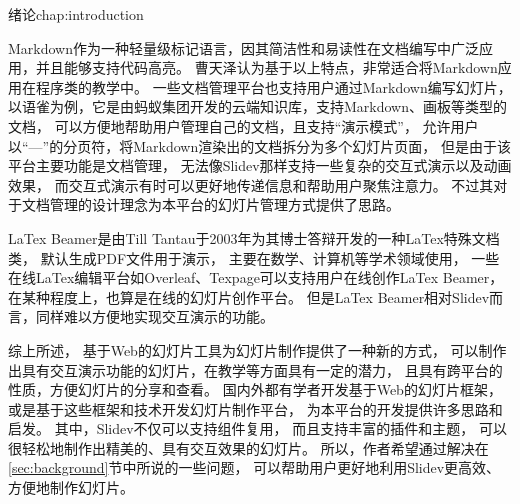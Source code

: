 \begin{cuzchapter}{绪论}{chap:introduction}
	

	
	Markdown作为一种轻量级标记语言，因其简洁性和易读性在文档编写中广泛应用，并且能够支持代码高亮。
	曹天泽认为基于以上特点，非常适合将Markdown应用在程序类的教学中\cite{HLKX202002056}。
	一些文档管理平台也支持用户通过Markdown编写幻灯片，
	以语雀为例，它是由蚂蚁集团开发的云端知识库，支持Markdown、画板等类型的文档，
	可以方便地帮助用户管理自己的文档，且支持“演示模式”，
	允许用户以“---”的分页符，将Markdown渲染出的文档拆分为多个幻灯片页面，
	但是由于该平台主要功能是文档管理，
	无法像Slidev那样支持一些复杂的交互式演示以及动画效果，
	而交互式演示有时可以更好地传递信息和帮助用户聚焦注意力。
	不过其对于文档管理的设计理念为本平台的幻灯片管理方式提供了思路。

	LaTex Beamer是由Till Tantau于2003年为其博士答辩开发的一种LaTex特殊文档类，
	默认生成PDF文件用于演示\cite{tantau2004user}，
	主要在数学、计算机等学术领域使用，
	一些在线LaTex编辑平台如Overleaf、Texpage可以支持用户在线创作LaTex Beamer，
	在某种程度上，也算是在线的幻灯片创作平台。
	但是LaTex Beamer相对Slidev而言，同样难以方便地实现交互演示的功能。


	
	综上所述，
	基于Web的幻灯片工具为幻灯片制作提供了一种新的方式，
	可以制作出具有交互演示功能的幻灯片，在教学等方面具有一定的潜力，
	且具有跨平台的性质，方便幻灯片的分享和查看。
	国内外都有学者开发基于Web的幻灯片框架，或是基于这些框架和技术开发幻灯片制作平台，
	为本平台的开发提供许多思路和启发。
	其中，Slidev不仅可以支持组件复用，
	而且支持丰富的插件和主题，
	可以很轻松地制作出精美的、具有交互效果的幻灯片。
	所以，作者希望通过解决在\ref{sec:background}节中所说的一些问题，
	可以帮助用户更好地利用Slidev更高效、方便地制作幻灯片。
	

	



\end{cuzchapter}
